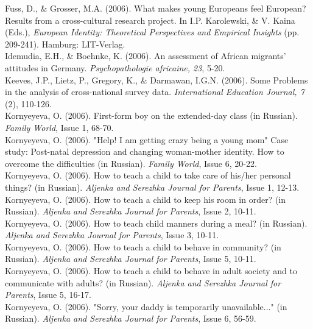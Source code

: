 Fuss, D., \& Grosser, M.A. (2006). What makes young Europeans feel European? Results from a cross-cultural research project. In I.P. Karolewski, \& V. Kaina (Eds.), \textit{European Identity: Theoretical Perspectives and Empirical Insights} (pp. 209-241). Hamburg: LIT-Verlag.\\

Idemudia, E.H., \& Boehnke, K. (2006). An assessment of African migrants' attitudes in Germany. \textit{Psychopathologie africaine, 23}, 5-20.\\

Keeves, J.P., Lietz, P., Gregory, K., \& Darmawan, I.G.N. (2006). Some Problems in the analysis of cross-national survey data. \textit{International Education Journal, 7} (2), 110-126.\\

Kornyeyeva, O. (2006).  First-form boy on the extended-day class (in Russian). \textit{Family World}, Issue 1, 68-70.\\

Kornyeyeva, O. (2006). "Help! I am getting crazy being a young mom" Case study: Post-natal depression and changing woman-mother identity. How to overcome the difficulties (in Russian). \textit{Family World}, Issue 6, 20-22.\\

Kornyeyeva, O. (2006). How to teach a child to take care of his/her personal things? (in Russian). \textit{Aljenka and Serezhka Journal for Parents}, Issue 1, 12-13.\\

Kornyeyeva, O. (2006). How to teach a child to keep his room in order? (in Russian). \textit{Aljenka and Serezhka Journal for Parents}, Issue 2, 10-11.\\

Kornyeyeva, O. (2006). How to teach child manners during a meal? (in Russian). \textit{Aljenka and Serezhka Journal for Parents}, Issue 3, 10-11.\\

Kornyeyeva, O. (2006). How to teach a child to behave in community? (in Russian). \textit{Aljenka and Serezhka Journal for Parents}, Issue 5, 10-11.\\

Kornyeyeva, O. (2006). How to teach a child to behave in adult society and to communicate with adults? (in Russian). \textit{Aljenka and Serezhka Journal for Parents}, Issue 5, 16-17.\\

Kornyeyeva, O. (2006). "Sorry, your daddy is temporarily unavailable..." (in Russian). \textit{Aljenka and Serezhka Journal for Parents}, Issue 6, 56-59.\\

